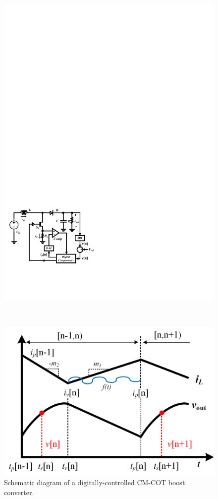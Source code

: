 \begin{figure}
\begin{minipage}{0.32\textwidth}
    \centering
    \includegraphics[width=\textwidth]{Figure/section2/schematiceboost.pdf}
    \caption{ \label{fig:eboostschmatic} Schematic diagram of a digitally-controlled CM-COT boost converter.}
\end{minipage}
~
\begin{minipage}{0.32\textwidth}
    \centering
    \includegraphics[width=\textwidth]{Figure/section2/eboostwaveform.png}

\end{minipage}
\end{figure}
